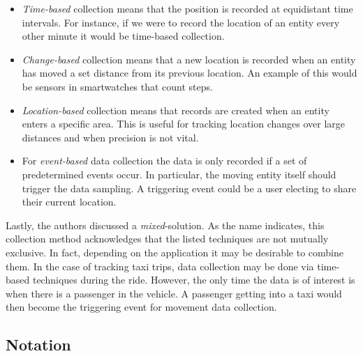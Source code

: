 \begin{itemize}
\item \textit{Time-based} collection means that the position is recorded at equidistant time intervals. 
For instance, if we were to record the location of an entity every other minute it would be time-based collection. 
\medskip

\item \textit{Change-based} collection means that a new location is recorded when an entity has moved a set distance from its previous location. 
An example of this would be sensors in smartwatches that count steps. 
\medskip

\item \textit{Location-based} collection means that records are created when an entity enters a specific area. This is useful for tracking location changes over large distances and when precision is not vital.  
\medskip

\item For \textit{event-based} data collection the data is only recorded if a set of predetermined events occur. In particular, the moving entity itself should trigger the data sampling. A triggering event could be a user electing to share their current location. 
\medskip

\end{itemize}

Lastly, the authors discussed a \textit{mixed}-solution. 
As the name indicates, this collection method acknowledges that the listed techniques are not mutually exclusive. 
In fact, depending on the application it may be desirable to combine them. 
In the case of tracking taxi trips, data collection may be done via time-based techniques during the ride. 
However, the only time the data is of interest is when there is a passenger in the vehicle.
A passenger getting into a taxi would then become the triggering event for movement data collection.


\subsection{Notation}


